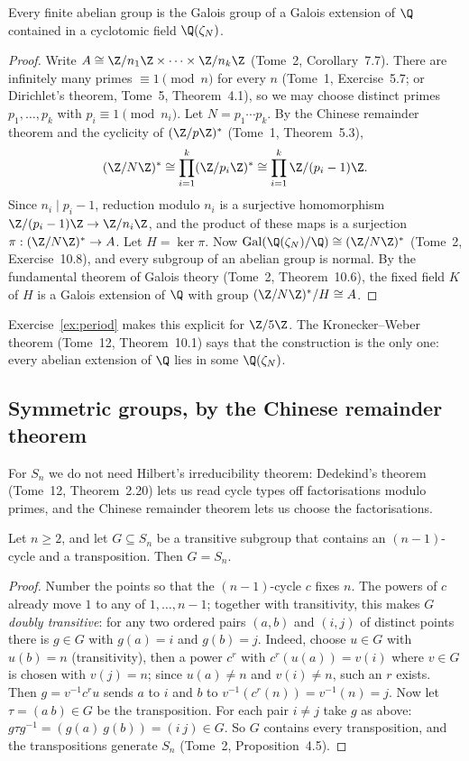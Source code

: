 \begin{theorem}\label{thm:abelian}
Every finite abelian group is the Galois group of a Galois extension of $\Q$ contained in a cyclotomic field $\Q(\zeta_N)$.
\end{theorem}
\begin{proof}
Write $A\cong\Z/n_1\Z\times\dots\times\Z/n_k\Z$ (Tome~2, Corollary~7.7). There are infinitely many primes $\equiv1\pmod n$ for every $n$ (Tome~1,
Exercise~5.7; or Dirichlet's theorem, Tome~5, Theorem~4.1), so we may choose distinct primes $p_1,\dots,p_k$ with $p_i\equiv1\pmod{n_i}$. Let
$N=p_1\cdots p_k$. By the Chinese remainder theorem and the cyclicity of $(\Z/p\Z)^*$ (Tome~1, Theorem~5.3),
\[
(\Z/N\Z)^*\cong\prod_{i=1}^k(\Z/p_i\Z)^*\cong\prod_{i=1}^k\Z/(p_i-1)\Z.
\]
Since $n_i\mid p_i-1$, reduction modulo $n_i$ is a surjective homomorphism $\Z/(p_i-1)\Z\to\Z/n_i\Z$, and the product of these maps is a surjection
$\pi:(\Z/N\Z)^*\to A$. Let $H=\ker\pi$. Now $\operatorname{Gal}(\Q(\zeta_N)/\Q)\cong(\Z/N\Z)^*$ (Tome~2, Exercise~10.8), and every subgroup of an abelian
group is normal. By the fundamental theorem of Galois theory (Tome~2, Theorem~10.6), the fixed field $K$ of $H$ is a Galois extension of $\Q$ with group
$(\Z/N\Z)^*/H\cong A$.
\end{proof}

Exercise~\ref{ex:period} makes this explicit for $\Z/5\Z$. The Kronecker--Weber theorem (Tome~12, Theorem~10.1) says that the construction is the only one:
every abelian extension of $\Q$ lies in some $\Q(\zeta_N)$.

\subsection*{Symmetric groups, by the Chinese remainder theorem}

For $S_n$ we do not need Hilbert's irreducibility theorem: Dedekind's theorem (Tome~12, Theorem~2.20) lets us read cycle types off factorisations modulo
primes, and the Chinese remainder theorem lets us choose the factorisations.

\begin{lemma}\label{lem:sngen}
Let $n\ge2$, and let $G\subseteq S_n$ be a transitive subgroup that contains an $(n-1)$-cycle and a transposition. Then $G=S_n$.
\end{lemma}
\begin{proof}
Number the points so that the $(n-1)$-cycle $c$ fixes $n$. The powers of $c$ already move $1$ to any of $1,\dots,n-1$; together with transitivity, this
makes $G$ \emph{doubly transitive}: for any two ordered pairs $(a,b)$ and $(i,j)$ of distinct points there is $g\in G$ with $g(a)=i$ and $g(b)=j$. Indeed,
choose $u\in G$ with $u(b)=n$ (transitivity), then a power $c^r$ with $c^r(u(a))=v(i)$ where $v\in G$ is chosen with $v(j)=n$; since $u(a)\ne n$ and
$v(i)\ne n$, such an $r$ exists. Then $g=v^{-1}c^ru$ sends $a$ to $i$ and $b$ to $v^{-1}(c^r(n))=v^{-1}(n)=j$. Now let $\tau=(a\ b)\in G$ be the
transposition. For each pair $i\ne j$ take $g$ as above: $g\tau g^{-1}=(g(a)\ g(b))=(i\ j)\in G$. So $G$ contains every transposition, and the
transpositions generate $S_n$ (Tome~2, Proposition~4.5).
\end{proof}

